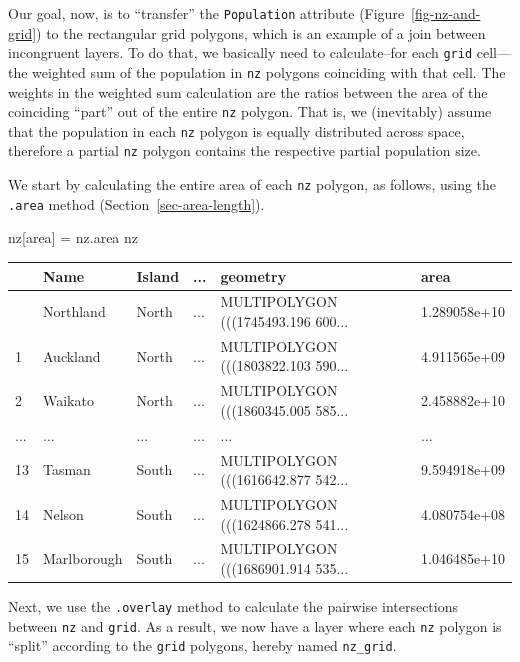 \documentclass[
  letterpaper,
]{krantz}
\newenvironment{Shaded}{\begin{snugshade}}{\end{snugshade}}
\newcommand{\NormalTok}[1]{\textcolor[rgb]{0.00,0.23,0.31}{#1}}
\newcommand{\OperatorTok}[1]{\textcolor[rgb]{0.37,0.37,0.37}{#1}}
\newcommand{\StringTok}[1]{\textcolor[rgb]{0.13,0.47,0.30}{#1}}
\begin{document}
Our goal, now, is to ``transfer'' the
\texttt{\textquotesingle{}Population\textquotesingle{}} attribute
(Figure~\ref{fig-nz-and-grid}) to the rectangular grid polygons, which
is an example of a join between incongruent layers. To do that, we
basically need to calculate--for each \texttt{grid} cell---the weighted
sum of the population in \texttt{nz} polygons coinciding with that cell.
The weights in the weighted sum calculation are the ratios between the
area of the coinciding ``part'' out of the entire \texttt{nz} polygon.
That is, we (inevitably) assume that the population in each \texttt{nz}
polygon is equally distributed across space, therefore a partial
\texttt{nz} polygon contains the respective partial population size.

We start by calculating the entire area of each \texttt{nz} polygon, as
follows, using the \texttt{.area} method
(Section~\ref{sec-area-length}).

\begin{Shaded}
\begin{Highlighting}[]
\NormalTok{nz[}\StringTok{\textquotesingle{}area\textquotesingle{}}\NormalTok{] }\OperatorTok{=}\NormalTok{ nz.area}
\NormalTok{nz}
\end{Highlighting}
\end{Shaded}

\begin{longtable}[]{@{}llllll@{}}
\toprule\noalign{}
& Name & Island & ... & geometry & area \\
\midrule\noalign{}
\endhead
\bottomrule\noalign{}
\endlastfoot
0 & Northland & North & ... & MULTIPOLYGON (((1745493.196 600... &
1.289058e+10 \\
1 & Auckland & North & ... & MULTIPOLYGON (((1803822.103 590... &
4.911565e+09 \\
2 & Waikato & North & ... & MULTIPOLYGON (((1860345.005 585... &
2.458882e+10 \\
... & ... & ... & ... & ... & ... \\
13 & Tasman & South & ... & MULTIPOLYGON (((1616642.877 542... &
9.594918e+09 \\
14 & Nelson & South & ... & MULTIPOLYGON (((1624866.278 541... &
4.080754e+08 \\
15 & Marlborough & South & ... & MULTIPOLYGON (((1686901.914 535... &
1.046485e+10 \\
\end{longtable}

Next, we use the \texttt{.overlay} method to calculate the pairwise
intersections between \texttt{nz} and \texttt{grid}. As a result, we now
have a layer where each \texttt{nz} polygon is ``split'' according to
the \texttt{grid} polygons, hereby named \texttt{nz\_grid}.
\end{document}
